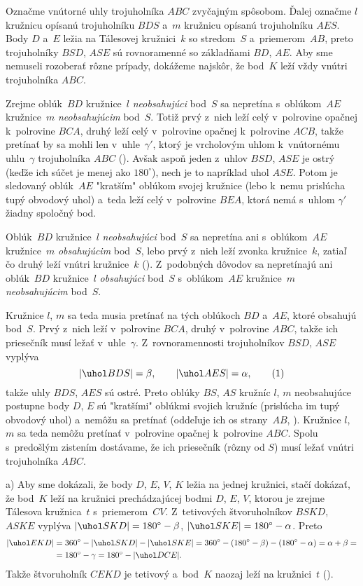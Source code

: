 {%
Označme vnútorné uhly trojuholníka $ABC$ zvyčajným spôsobom. Ďalej označme $l$ kružnicu opísanú trojuholníku $BDS$ a~$m$ kružnicu opísanú trojuholníku $AES$. Body $D$ a~$E$ ležia na Tálesovej kružnici~$k$ so stredom~$S$ a~priemerom~$AB$, preto trojuholníky $BSD$, $ASE$ sú rovnoramenné so základňami $BD$, $AE$. Aby sme nemuseli rozoberať rôzne prípady, dokážeme najskôr, že bod~$K$ leží vždy vnútri trojuholníka $ABC$.

Zrejme oblúk~$BD$ kružnice~$l$ {\it neobsahujúci\/} bod~$S$ sa nepretína s~oblúkom~$AE$ kružnice~$m$ {\it neobsahujúcim\/} bod~$S$. Totiž prvý z~nich leží celý v~polrovine opačnej k~polrovine $BCA$, druhý leží celý v~polrovine opačnej k~polrovine $ACB$, takže pretínať by sa mohli len v~uhle~$\gamma'$, ktorý je vrcholovým uhlom k~vnútornému uhlu~$\gamma$ trojuholníka $ABC$ (\obr).
%
Avšak aspoň jeden z~uhlov $BSD$, $ASE$ je ostrý (keďže ich súčet je menej ako $180^\circ$), nech je to napríklad uhol $ASE$. Potom je sledovaný oblúk~$AE$ "kratším" oblúkom svojej kružnice (lebo k~nemu prislúcha tupý obvodový uhol) a~teda leží celý v~polrovine $BEA$, ktorá nemá s~uhlom $\gamma'$ žiadny spoločný bod.

Oblúk~$BD$ kružnice~$l$ {\it neobsahujúci\/} bod~$S$ sa nepretína ani s~oblúkom~$AE$ kružnice~$m$ {\it obsahujúcim\/} bod~$S$, lebo prvý z~nich leží zvonka kružnice~$k$, zatiaľ čo druhý leží vnútri kružnice~$k$ (\obr).
%
Z~podobných dôvodov sa nepretínajú ani oblúk~$BD$ kružnice~$l$ {\it obsahujúci\/} bod~$S$ s~oblúkom~$AE$ kružnice~$m$ {\it neobsahujúcim\/} bod~$S$.

Kružnice $l$, $m$ sa teda musia pretínať na tých oblúkoch $BD$ a~$AE$, ktoré obsahujú bod~$S$. Prvý z~nich leží v~polrovine $BCA$, druhý v~polrovine $ABC$, takže ich priesečník musí ležať v~uhle~$\gamma$. Z~rovnoramennosti trojuholníkov $BSD$, $ASE$ vyplýva
$$
|\uhol BDS|=\beta,\qquad |\uhol AES|=\alpha,\tag1
$$
takže uhly $BDS$, $AES$ sú ostré. Preto oblúky $BS$, $AS$ kružníc $l$, $m$ neobsahujúce postupne body $D$, $E$ sú "kratšími" oblúkmi svojich kružníc (prislúcha im tupý obvodový uhol) a~nemôžu sa pretínať (oddeľuje ich os strany~$AB$, \obr).
%
Kružnice $l$, $m$ sa teda nemôžu pretínať v~polrovine opačnej k~polrovine $ABC$. Spolu s~predošlým zistením dostávame, že ich priesečník (rôzny od $S$) musí ležať vnútri trojuholníka $ABC$.

\smallskip
a)
Aby sme dokázali, že body $D$, $E$, $V$, $K$ ležia na jednej kružnici, stačí dokázať, že bod~$K$ leží na kružnici prechádzajúcej bodmi $D$, $E$, $V$, ktorou je zrejme Tálesova kružnica~$t$ s~priemerom~$CV$. Z~tetivových štvoruholníkov $BSKD$, $ASKE$ vyplýva $|\uhol SKD|=180^\circ-\beta$, $|\uhol SKE|=180^\circ-\alpha$. Preto
$$
\aligned
|\uhol EKD|&=360^\circ-|\uhol SKD|-|\uhol SKE|=360^\circ-(180^\circ-\beta)-(180^\circ-\alpha)=\alpha+\beta=\\
&=180^\circ-\gamma=180^\circ-|\uhol DCE|.
\endaligned
$$
Takže štvoruholník $CEKD$ je tetivový a~bod~$K$ naozaj leží na kružnici~$t$ (\obr).
%

}
